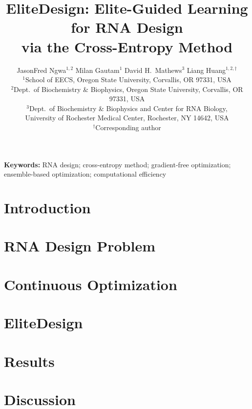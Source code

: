 \documentclass[10pt,letterpaper,twocolumn]{article}
\title{\Large\textcolor{titleblue}{EliteDesign: Elite-Guided Learning for RNA Design\\via the Cross-Entropy Method}}
\author{JasonFred Ngwa$^{1,2}$ \qquad Milan Gautam$^{1}$ \qquad David H.~Mathews$^{3}$ \qquad Liang Huang$^{1,2,\dagger}$\\[6pt]
{$^{1}$School of EECS, Oregon State University, Corvallis, OR 97331, USA}\\
{$^{2}$Dept.~of Biochemistry \& Biophysics, Oregon State University, Corvallis, OR 97331, USA}\\
{$^{3}$Dept.~of Biochemistry \& Biophysics and Center for RNA Biology,}\\
{University of Rochester Medical Center, Rochester, NY 14642, USA}\\
{$^{\dagger}$Corresponding author}}
\date{}
\begin{document}
\onecolumn
\begingroup
{}\selectfont
\maketitle
\thispagestyle{empty}
\begin{abstract}
\normalsize

\end{abstract}
\noindent\textbf{Keywords:} RNA design; cross-entropy method; gradient-free optimization; ensemble-based optimization; computational efficiency
\endgroup
\twocolumn
\setcounter{page}{1}

\section{Introduction}\label{sec:intro}


\section{RNA Design Problem}\label{sec:problem}


\section{Continuous Optimization}\label{sec:continuous}


\section{EliteDesign}\label{sec:elitedesign}


\section{Results}\label{sec:results}


\section{Discussion}\label{sec:discussion}


\clearpage
\renewcommand{\refname}{\textcolor{titleblue}{References}}



\clearpage
\onecolumn
\appendix

\end{document}
